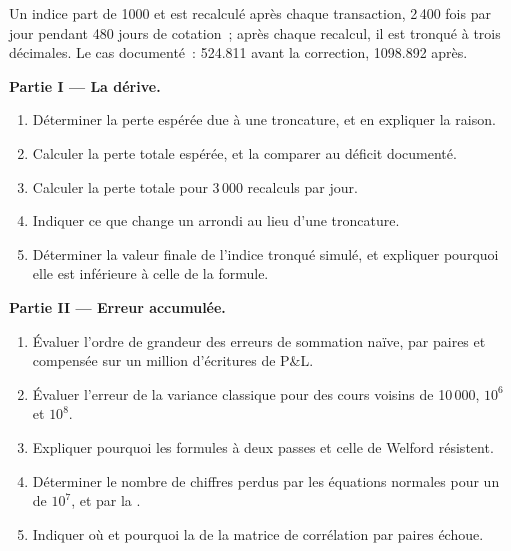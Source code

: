 \begin{problem}\label{pb:qm:floating-point-and-numerical-linear-algebra:1}
Un indice part de 1000 et est recalculé après chaque transaction, 2\,400 fois par jour pendant 480 jours de cotation~; après chaque recalcul, il est tronqué à trois décimales. Le cas documenté~: 524.811 avant la
correction, 1098.892 après.

\medskip\noindent\textbf{Partie I --- La dérive.}
\begin{enumerate}
\item Déterminer la perte espérée due à une troncature, et en expliquer la raison.
\item Calculer la perte totale espérée, et la comparer au déficit documenté.
\item Calculer la perte totale pour 3\,000 recalculs par jour.
\item Indiquer ce que change un arrondi au lieu d'une troncature.
\item Déterminer la valeur finale de l'indice tronqué simulé, et expliquer pourquoi elle est inférieure à celle de la formule.
\end{enumerate}

\medskip\noindent\textbf{Partie II --- Erreur accumulée.}
\begin{enumerate}[resume]
\item Évaluer l'ordre de grandeur des erreurs de sommation naïve, par paires et compensée sur un million d'écritures de P\&L.
\item Évaluer l'erreur de la variance classique pour des cours voisins de 10\,000, $10^6$ et $10^8$.
\item Expliquer pourquoi les formules à deux passes et celle de Welford résistent.
\item Déterminer le nombre de chiffres perdus par les équations normales pour un  de $10^7$, et par la .
\item Indiquer où et pourquoi la  de la matrice de corrélation par paires échoue.
\end{enumerate}


\end{problem}
